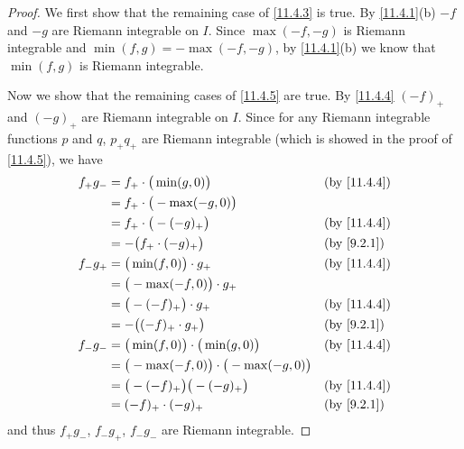 \begin{proof}
  We first show that the remaining case of \cref{11.4.3} is true.
  By \cref{11.4.1}(b) \(-f\) and \(-g\) are Riemann integrable on \(I\).
  Since \(\max(-f, -g)\) is Riemann integrable and \(\min(f, g) = -\max(-f, -g)\), by \cref{11.4.1}(b) we know that \(\min(f, g)\) is Riemann integrable.

  Now we show that the remaining cases of \cref{11.4.5} are true.
  By \cref{11.4.4} \((-f)_+\) and \((-g)_+\) are Riemann integrable on \(I\).
  Since for any Riemann integrable functions \(p\) and \(q\), \(p_+ q_+\) are Riemann integrable (which is showed in the proof of \cref{11.4.5}), we have
  \begin{align*}
    f_+ g_- & = f_+ \cdot \big(\min(g, 0)\big)                      &  & \text{(by \cref{11.4.4})} \\
            & = f_+ \cdot \big(-\max(-g, 0)\big)                                                   \\
            & = f_+ \cdot \big(-(-g)_+\big)                         &  & \text{(by \cref{11.4.4})} \\
            & = -\big(f_+ \cdot (-g)_+\big)                         &  & \by{9.2.1}                \\
    f_- g_+ & = \big(\min(f, 0)\big) \cdot g_+                      &  & \text{(by \cref{11.4.4})} \\
            & = \big(-\max(-f, 0)\big) \cdot g_+                                                   \\
            & = \big(-(-f)_+\big) \cdot g_+                         &  & \text{(by \cref{11.4.4})} \\
            & = -\big((-f)_+ \cdot g_+\big)                         &  & \by{9.2.1}                \\
    f_- g_- & = \big(\min(f, 0)\big) \cdot \big(\min(g, 0)\big)     &  & \text{(by \cref{11.4.4})} \\
            & = \big(-\max(-f, 0)\big) \cdot \big(-\max(-g, 0)\big)                                \\
            & = \big(-(-f)_+\big) \big(-(-g)_+\big)                 &  & \text{(by \cref{11.4.4})} \\
            & = (-f)_+ \cdot (-g)_+                                 &  & \by{9.2.1}
  \end{align*}
  and thus \(f_+ g_-\), \(f_- g_+\), \(f_- g_-\) are Riemann integrable.
\end{proof}